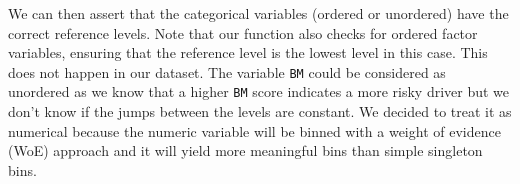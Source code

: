 \documentclass[
  english,
  11pt,
]{article}
\newenvironment{Shaded}{\begin{snugshade}}{\end{snugshade}}
\newcommand{\AttributeTok}[1]{\textcolor[rgb]{0.13,0.29,0.53}{#1}}
\newcommand{\CommentTok}[1]{\textcolor[rgb]{0.56,0.35,0.01}{\textit{#1}}}
\newcommand{\ConstantTok}[1]{\textcolor[rgb]{0.56,0.35,0.01}{#1}}
\newcommand{\ControlFlowTok}[1]{\textcolor[rgb]{0.13,0.29,0.53}{\textbf{#1}}}
\newcommand{\DecValTok}[1]{\textcolor[rgb]{0.00,0.00,0.81}{#1}}
\newcommand{\FunctionTok}[1]{\textcolor[rgb]{0.13,0.29,0.53}{\textbf{#1}}}
\newcommand{\NormalTok}[1]{#1}
\newcommand{\OtherTok}[1]{\textcolor[rgb]{0.56,0.35,0.01}{#1}}
\newcommand{\SpecialCharTok}[1]{\textcolor[rgb]{0.81,0.36,0.00}{\textbf{#1}}}
\newcommand{\StringTok}[1]{\textcolor[rgb]{0.31,0.60,0.02}{#1}}
\begin{document}
We can then assert that the categorical variables (ordered or unordered)
have the correct reference levels. Note that our function also checks
for ordered factor variables, ensuring that the reference level is the
lowest level in this case. This does not happen in our dataset. The
variable \texttt{BM} could be considered as unordered as we know that a
higher \texttt{BM} score indicates a more risky driver but we don't know
if the jumps between the levels are constant. We decided to treat it as
numerical because the numeric variable will be binned with a weight of
evidence (WoE) approach and it will yield more meaningful bins than
simple singleton bins.

\begin{Shaded}
\end{Shaded}
\end{document}
